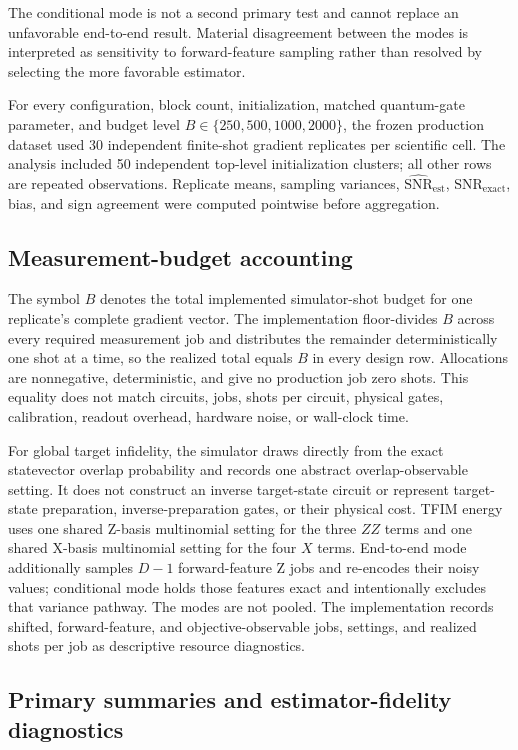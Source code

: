 \documentclass[pdflatex,sn-mathphys-num,Numbered]{sn-jnl}
\newcommand{\snrest}{\widehat{\mathrm{SNR}}_{\mathrm{est}}}
\newcommand{\snrexact}{\mathrm{SNR}_{\mathrm{exact}}}
\begin{document}
The conditional mode is not a second primary test and cannot replace an unfavorable end-to-end result. Material disagreement between the modes is interpreted as sensitivity to forward-feature sampling rather than resolved by selecting the more favorable estimator.

For every configuration, block count, initialization, matched quantum-gate parameter, and budget level $B\in\{250,500,1000,2000\}$, the frozen production dataset used 30 independent finite-shot gradient replicates per scientific cell. The analysis included 50 independent top-level initialization clusters; all other rows are repeated observations. Replicate means, sampling variances, $\snrest$, $\snrexact$, bias, and sign agreement were computed pointwise before aggregation.

\subsection{Measurement-budget accounting}
\label{sec:budget}

The symbol $B$ denotes the total implemented simulator-shot budget for one replicate's complete gradient vector. The implementation floor-divides $B$ across every required measurement job and distributes the remainder deterministically one shot at a time, so the realized total equals $B$ in every design row. Allocations are nonnegative, deterministic, and give no production job zero shots. This equality does not match circuits, jobs, shots per circuit, physical gates, calibration, readout overhead, hardware noise, or wall-clock time.

For global target infidelity, the simulator draws directly from the exact statevector overlap probability and records one abstract overlap-observable setting. It does not construct an inverse target-state circuit or represent target-state preparation, inverse-preparation gates, or their physical cost. TFIM energy uses one shared Z-basis multinomial setting for the three $ZZ$ terms and one shared X-basis multinomial setting for the four $X$ terms. End-to-end mode additionally samples $D-1$ forward-feature Z jobs and re-encodes their noisy values; conditional mode holds those features exact and intentionally excludes that variance pathway. The modes are not pooled. The implementation records shifted, forward-feature, and objective-observable jobs, settings, and realized shots per job as descriptive resource diagnostics.

\subsection{Primary summaries and estimator-fidelity diagnostics}
\end{document}
